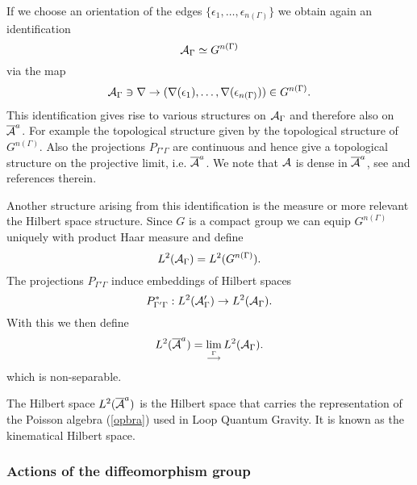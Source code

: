 \documentclass[12pt]{article}
\def\e{\epsilon}
\def\ca{{\cal A}}
\begin{document}
If we choose an orientation of the edges $\{ \e_1,\ldots, \e_{n(\Gamma)}\}$ we obtain again an identification 
$$\ca_{\Gamma}\simeq G^{n(\Gamma)}$$
via the map 
$$\ca_{\Gamma}\ni \nabla \to (\nabla (\e_1),\ldots , \nabla (\e_{n({\Gamma})}))\in G^{n(\Gamma)}.$$
This identification gives rise to various structures on $\ca_\Gamma$ and therefore also on $\overline{\ca}^{\small a}$. For example the topological structure given by the topological structure of $G^{n(\Gamma)}$. Also the projections $P_{\Gamma ' \Gamma}$ are continuous and hence give a topological structure on the projective limit, i.e. $\overline{\ca}^{\small a}$. We note that $\ca$ is dense in $\overline{\ca}^{\small a}$, see \cite{Aastrup} and references therein.




Another structure arising from this identification is the measure or more relevant the Hilbert space structure. Since $G$ is a compact group we can equip $G^{n(\Gamma)}$ uniquely with product Haar measure and define 
$$L^2(\ca_\Gamma)=L^2(G^{n(\Gamma)}).$$
The projections $P_{\Gamma' \Gamma}$ induce embeddings of Hilbert spaces 
$$P_{\Gamma' \Gamma}^*:L^2(\ca_\Gamma')\to L^2(\ca_\Gamma).$$
With this we then define
$$L^2(\overline{\ca}^{\small a})=\lim_{\stackrel{\Gamma}{\longrightarrow}}L^2(\ca_\Gamma).$$
which is non-separable.

The Hilbert space $L^2(\overline{\ca}^{\small a})$ is the Hilbert space that carries the representation of the Poisson algebra (\ref{opbra}) used in Loop Quantum Gravity. It is known as the kinematical Hilbert space.






\subsubsection{Actions of the diffeomorphism group}
\end{document}
